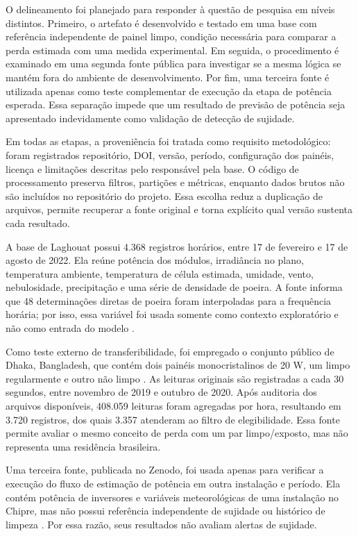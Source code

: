 \documentclass{UNESC}
\begin{document}
O delineamento foi planejado para responder à questão de pesquisa em níveis distintos. Primeiro, o artefato é desenvolvido e testado em uma base com referência independente de painel limpo, condição necessária para comparar a perda estimada com uma medida experimental. Em seguida, o procedimento é examinado em uma segunda fonte pública para investigar se a mesma lógica se mantém fora do ambiente de desenvolvimento. Por fim, uma terceira fonte é utilizada apenas como teste complementar de execução da etapa de potência esperada. Essa separação impede que um resultado de previsão de potência seja apresentado indevidamente como validação de detecção de sujidade.

Em todas as etapas, a proveniência foi tratada como requisito metodológico: foram registrados repositório, DOI, versão, período, configuração dos painéis, licença e limitações descritas pelo responsável pela base. O código de processamento preserva filtros, partições e métricas, enquanto dados brutos não são incluídos no repositório do projeto. Essa escolha reduz a duplicação de arquivos, permite recuperar a fonte original e torna explícito qual versão sustenta cada resultado.

A base de Laghouat possui 4.368 registros horários, entre 17 de fevereiro e 17 de agosto de 2022. Ela reúne potência dos módulos, irradiância no plano, temperatura ambiente, temperatura de célula estimada, umidade, vento, nebulosidade, precipitação e uma série de densidade de poeira. A fonte informa que 48 determinações diretas de poeira foram interpoladas para a frequência horária; por isso, essa variável foi usada somente como contexto exploratório e não como entrada do modelo \cite{seghir2026}.

Como teste externo de transferibilidade, foi empregado o conjunto público de Dhaka, Bangladesh, que contém dois painéis monocristalinos de 20 W, um limpo regularmente e outro não limpo \cite{akter2025}. As leituras originais são registradas a cada 30 segundos, entre novembro de 2019 e outubro de 2020. Após auditoria dos arquivos disponíveis, 408.059 leituras foram agregadas por hora, resultando em 3.720 registros, dos quais 3.357 atenderam ao filtro de elegibilidade. Essa fonte permite avaliar o mesmo conceito de perda com um par limpo/exposto, mas não representa uma residência brasileira.

Uma terceira fonte, publicada no Zenodo, foi usada apenas para verificar a execução do fluxo de estimação de potência em outra instalação e período. Ela contém potência de inversores e variáveis meteorológicas de uma instalação no Chipre, mas não possui referência independente de sujidade ou histórico de limpeza \cite{symeonides2024}. Por essa razão, seus resultados não avaliam alertas de sujidade.
\end{document}
